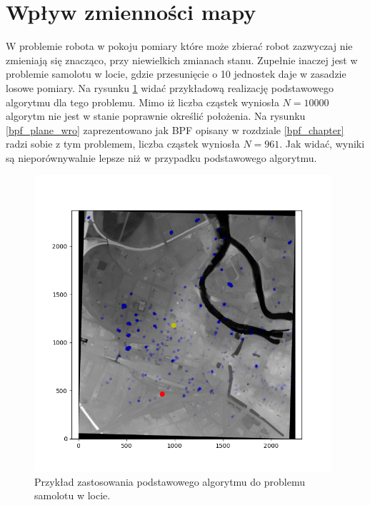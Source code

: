 \section{Wpływ zmienności mapy} \label{zmienna_mapa_chap}
W problemie robota w pokoju pomiary które może zbierać robot zazwyczaj nie zmieniają się znacząco, przy niewielkich zmianach stanu. Zupełnie inaczej jest w problemie samolotu w locie, gdzie przesunięcie o 10 jednostek daje w zasadzie losowe pomiary. Na rysunku \ref{pf_plane} widać przykładową realizację podstawowego algorytmu dla tego problemu. Mimo iż liczba cząstek wyniosła $N=10000$ algorytm nie jest w stanie poprawnie określić położenia. Na rysunku \ref{bpf_plane_wro} zaprezentowano jak BPF opisany w rozdziale \ref{bpf_chapter} radzi sobie z tym problemem, liczba cząstek wyniosła $N=961$. Jak widać, wyniki są nieporównywalnie lepsze niż w przypadku podstawowego algorytmu.
\begin{figure}[H]
	\begin{center}
		\includegraphics[width=11cm]{./pf_plane.png}
		\caption{Przykład zastosowania podstawowego algorytmu do problemu samolotu w locie.}
		\label{pf_plane}
	\end{center}
\end{figure}
